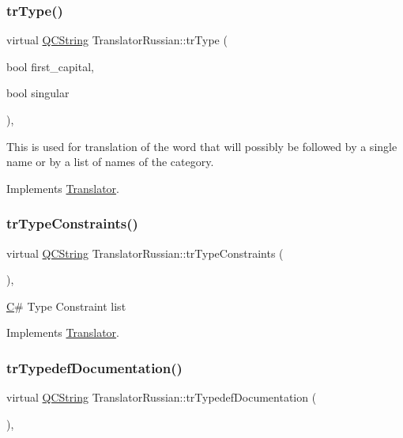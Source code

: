 \subsubsection{\texorpdfstring{trType()}{trType()}}
{\footnotesize\ttfamily virtual \mbox{\hyperlink{class_q_c_string}{Q\+C\+String}} Translator\+Russian\+::tr\+Type (\begin{DoxyParamCaption}\item[{bool}]{first\+\_\+capital,  }\item[{bool}]{singular }\end{DoxyParamCaption})\hspace{0.3cm}{\ttfamily [inline]}, {\ttfamily [virtual]}}

This is used for translation of the word that will possibly be followed by a single name or by a list of names of the category. 

Implements \mbox{\hyperlink{class_translator}{Translator}}.

\mbox{\label{class_translator_russian_a4691b3b393451017b7a0ac9a2d93444e}} 
\subsubsection{\texorpdfstring{trTypeConstraints()}{trTypeConstraints()}}
{\footnotesize\ttfamily virtual \mbox{\hyperlink{class_q_c_string}{Q\+C\+String}} Translator\+Russian\+::tr\+Type\+Constraints (\begin{DoxyParamCaption}{ }\end{DoxyParamCaption})\hspace{0.3cm}{\ttfamily [inline]}, {\ttfamily [virtual]}}

\mbox{\hyperlink{class_c}{C}}\# Type Constraint list 

Implements \mbox{\hyperlink{class_translator}{Translator}}.

\mbox{\label{class_translator_russian_adfaeb3fb1c26949919b6ce5b248fdb7c}} 
\subsubsection{\texorpdfstring{trTypedefDocumentation()}{trTypedefDocumentation()}}
{\footnotesize\ttfamily virtual \mbox{\hyperlink{class_q_c_string}{Q\+C\+String}} Translator\+Russian\+::tr\+Typedef\+Documentation (\begin{DoxyParamCaption}{ }\end{DoxyParamCaption})\hspace{0.3cm}{\ttfamily [inline]}, {\ttfamily [virtual]}}

